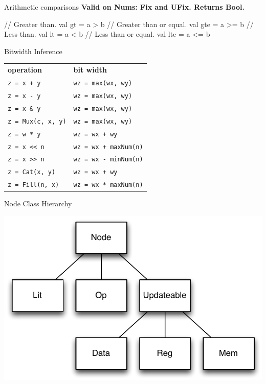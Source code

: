 \documentclass[xcolor=pdflatex,dvipsnames,table]{beamer}
\begin{document}
\begin{frame}[fragile]{Arithmetic comparisons}
\textbf{Valid on Nums: Fix and UFix. Returns Bool.}
\begin{scala}
// Greater than.
val gt  = a > b   
// Greater than or equal.
val gte = a >= b  
// Less than.
val lt  = a < b   
// Less than or equal.
val lte = a <= b  
\end{scala}
\end{frame}

\begin{frame}[fragile]{Bitwidth Inference}
\begin{center}
\begin{tabular}{ll}
{\bf operation} & {\bf bit width} \\ 
\verb|z = x + y| & \verb+wz = max(wx, wy)+ \\
\verb+z = x - y+ & \verb+wz = max(wx, wy)+\\
\verb+z = x & y+ & \verb+wz = max(wx, wy)+ \\
\verb+z = Mux(c, x, y)+ & \verb+wz = max(wx, wy)+ \\
\verb+z = w * y+ & \verb!wz = wx + wy! \\
\verb+z = x << n+ & \verb!wz = wx + maxNum(n)! \\
\verb+z = x >> n+ & \verb+wz = wx - minNum(n)+ \\
\verb+z = Cat(x, y)+ & \verb!wz = wx + wy! \\
\verb+z = Fill(n, x)+ & \verb+wz = wx * maxNum(n)+ \\
\end{tabular}
\end{center}
\end{frame}

\begin{frame}[fragile]{Node Class Hierarchy}

\begin{center}
\includegraphics[height=0.9\textheight]{../manual/figs/node-hierarchy.pdf}
\end{center}

\end{frame}
\end{document}
